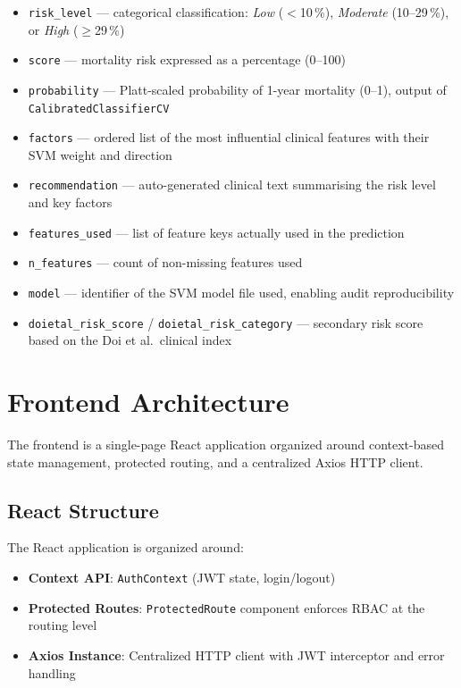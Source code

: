 \documentclass[12pt,a4paper,twoside]{report}
\begin{document}
\begin{itemize}
  \item \texttt{risk\_level} — categorical classification: \textit{Low} ($<$10\,\%), \textit{Moderate} (10–29\,\%), or \textit{High} ($\geq$29\,\%)
  \item \texttt{score} — mortality risk expressed as a percentage (0–100)
  \item \texttt{probability} — Platt-scaled probability of 1-year mortality (0–1), output of \texttt{CalibratedClassifierCV}
  \item \texttt{factors} — ordered list of the most influential clinical features with their SVM weight and direction
  \item \texttt{recommendation} — auto-generated clinical text summarising the risk level and key factors
  \item \texttt{features\_used} — list of feature keys actually used in the prediction
  \item \texttt{n\_features} — count of non-missing features used
  \item \texttt{model} — identifier of the SVM model file used, enabling audit reproducibility
  \item \texttt{doietal\_risk\_score} / \texttt{doietal\_risk\_category} — secondary risk score based on the Doi et al.\ clinical index
\end{itemize}

\section{Frontend Architecture}\label{sec:frontend}

The frontend is a single-page React application organized around context-based state management, protected routing, and a centralized Axios HTTP client.

\subsection{React Structure}

The React application is organized around:
\begin{itemize}
  \item \textbf{Context API}: \texttt{AuthContext} (JWT state, login/logout)
  \item \textbf{Protected Routes}: \texttt{ProtectedRoute} component enforces RBAC at the routing level
  \item \textbf{Axios Instance}: Centralized HTTP client with JWT interceptor and error handling
\end{itemize}
\end{document}
